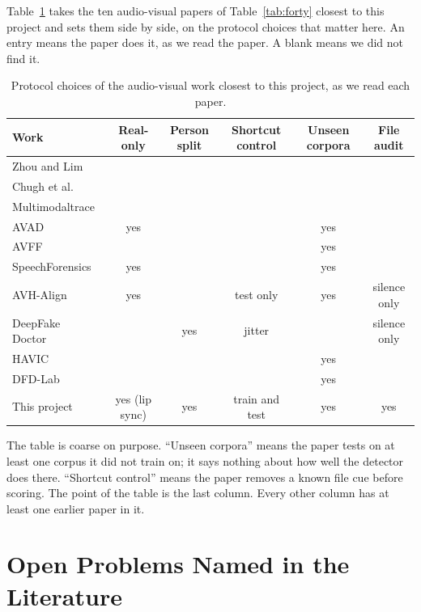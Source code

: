 Table~\ref{tab:litcompare} takes the ten audio-visual papers of
Table~\ref{tab:forty} closest to this project and sets them side by side, on
the protocol choices that matter here. An entry means the
paper does it, as we read the paper. A blank means we did not find it.

\begin{table}[ht]
    \centering
    \small
    \caption{Protocol choices of the audio-visual work closest to this project, as we read each paper.}
    \label{tab:litcompare}
    \begin{tabularx}{\textwidth}{@{}>{\raggedright\arraybackslash}X c c c c c@{}}
        \toprule
        \textbf{Work} & \textbf{Real-only} & \textbf{Person split} & \textbf{Shortcut control} & \textbf{Unseen corpora} & \textbf{File audit} \\
        \midrule
        Zhou and Lim~\cite{zhou2021} & & & & & \\
        Chugh et al.~\cite{notmade} & & & & & \\
        Multimodaltrace~\cite{multimodaltrace} & & & & & \\
        AVAD~\cite{avad} & yes & & & yes & \\
        AVFF~\cite{avff} & & & & yes & \\
        SpeechForensics~\cite{speechforensics} & yes & & & yes & \\
        AVH-Align~\cite{smeu2025} & yes & & test only & yes & silence only \\
        DeepFake Doctor~\cite{deepfakedoctor} & & yes & jitter & & silence only \\
        HAVIC~\cite{havic} & & & & yes & \\
        DFD-Lab~\cite{dfdlab2026} & & & & yes & \\
        This project & yes (lip sync) & yes & train and test & yes & yes \\
        \bottomrule
    \end{tabularx}
\end{table}

The table is coarse on purpose. ``Unseen corpora'' means the paper tests on
at least one corpus it did not train on; it says nothing about how well the
detector does there. ``Shortcut control'' means the paper removes a known
file cue before scoring. The point of the table is the last column. Every
other column has at least one earlier paper in it.

\section{Open Problems Named in the Literature}

